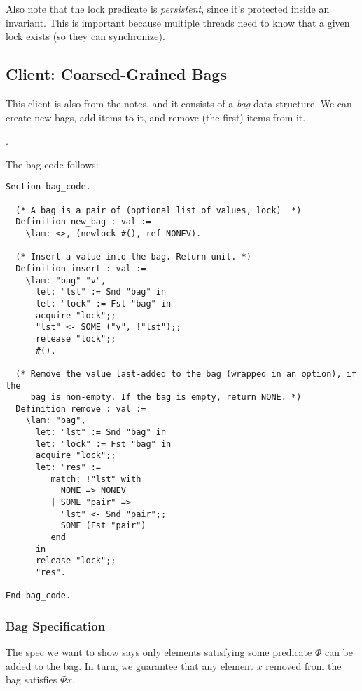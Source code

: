 Also note that the lock predicate is \emph{persistent}, since it's protected inside an invariant. This is important because multiple threads need to know that a given lock exists (so they can synchronize).

\subsection{Client: Coarsed-Grained Bags}

This client is also from the notes, and it consists of a \emph{bag} data structure. We can create new bags, add items to it, and remove (the first) items from it.

.

The bag code follows:

\begin{verbatim}
Section bag_code.

  (* A bag is a pair of (optional list of values, lock)  *)
  Definition new_bag : val :=
    \lam: <>, (newlock #(), ref NONEV).

  (* Insert a value into the bag. Return unit. *)
  Definition insert : val :=
    \lam: "bag" "v",
      let: "lst" := Snd "bag" in
      let: "lock" := Fst "bag" in
      acquire "lock";;
      "lst" <- SOME ("v", !"lst");;
      release "lock";;        
      #().        

  (* Remove the value last-added to the bag (wrapped in an option), if the
     bag is non-empty. If the bag is empty, return NONE. *)
  Definition remove : val :=
    \lam: "bag",
      let: "lst" := Snd "bag" in
      let: "lock" := Fst "bag" in
      acquire "lock";;
      let: "res" :=
         match: !"lst" with
           NONE => NONEV
         | SOME "pair" =>
           "lst" <- Snd "pair";;
           SOME (Fst "pair")
         end
      in           
      release "lock";;
      "res".        
  
End bag_code.
\end{verbatim}

\subsubsection{Bag Specification}

The spec we want to show says only elements satisfying some predicate $\Phi$ can be added to the bag. In turn, we guarantee that any element $x$ removed from the bag satisfies $\Phi x$.

